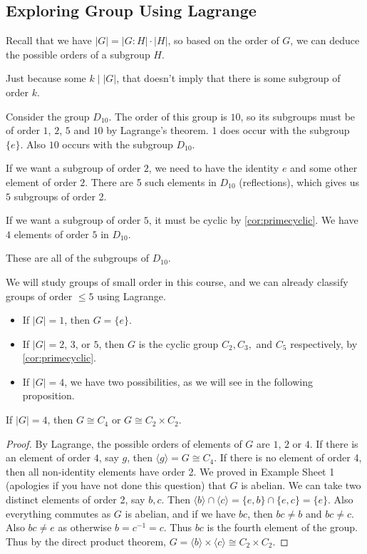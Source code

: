 \documentclass[a4paper]{scrartcl}
\begin{document}
\subsection{Exploring Group Using Lagrange}

Recall that we have $|G| = |G:H| \cdot |H|$, so based on the order of $G$, we can deduce the possible orders of a subgroup $H$.

\begin{remark}
	Just because some $k \mid |G|$, that doesn't imply that there is some subgroup of order $k$.
\end{remark}

\begin{example}[Subgroups of $D_{10}$]
	Consider the group $D_{10}$. The order of this group is $10$, so its subgroups must be of order $1$, $2$, $5$ and $10$ by Lagrange's theorem.
	$1$ does occur with the subgroup $\{e\}$. Also $10$ occurs with the subgroup $D_{10}$.

	If we want a subgroup of order $2$, we need to have the identity $e$ and some other element of order $2$. There are 5 such elements in $D_{10}$ (reflections), which gives us $5$ subgroups of order 2.

	If we want a subgroup of order $5$, it must be cyclic by \autoref{cor:primecyclic}. We have $4$ elements of order $5$ in $D_{10}$.

	These are all of the subgroups of $D_{10}$.
\end{example}

We will study groups of small order in this course, and we can already classify groups of order $\leq 5$ using Lagrange.

\begin{itemize}
	\item If $|G| = 1$, then $G = \{e\}$.
	\item If $|G| = 2$, $3$, or $5$, then $G$ is the cyclic group $C_2, C_3,$ and $C_5$ respectively, by \autoref{cor:primecyclic}.
	\item If $|G| = 4$, we have two possibilities, as we will see in the following proposition.
\end{itemize}

\begin{proposition}
	If $|G| = 4$, then $G \cong C_4$ or $G \cong C_2 \times C_2$.
\end{proposition}
\begin{proof}
	By Lagrange, the possible orders of elements of $G$ are $1$, $2$ or $4$. If there is an element of order $4$, say $g$, then $\langle g \rangle = G \cong C_4$. If there is no element of order 4, then all non-identity elements have order 2. We proved in Example Sheet 1 (apologies if you have not done this question) that $G$ is abelian. We can take two distinct elements of order 2, say $b, c$. Then $\langle b \rangle \cap \langle c \rangle = \{e, b\} \cap \{e, c\} = \{e\}$. Also everything commutes as $G$ is abelian, and if we have $bc$, then $bc \neq b$ and $bc \neq c$. Also $bc \neq e$ as otherwise $b = c^{-1} = c$. Thus $bc$ is the fourth element of the group. Thus by the direct product theorem, $G = \langle b \rangle \times \langle c \rangle \cong C_2 \times C_2$.
\end{proof}
\end{document}
